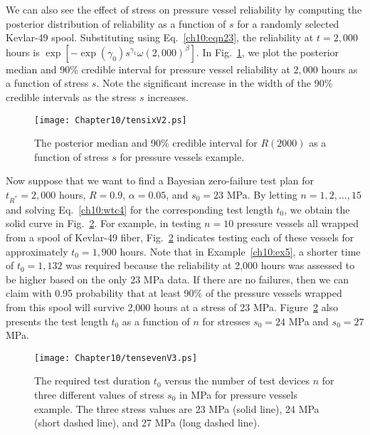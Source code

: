 \documentclass {book}
\begin{document}
We can also see the effect of stress on pressure vessel
reliability by computing the posterior distribution of reliability
as a function of $s$ for a randomly selected Kevlar-49 spool.
Substituting using Eq.~\ref{ch10:eqn23}, the reliability at $t =
2,000$ hours is $\exp[-\exp (\gamma_{0})s^{\gamma_{1}}\omega
(2,000)^{\beta}]$. In Fig.~\ref{ch10:fig6}, we plot the posterior
median and 90\% credible interval for pressure vessel reliability
at $2,000$ hours as a function of stress $s$. Note the significant
increase in the width of the 90\% credible intervals as the stress
$s$ increases.

\begin{figure}
\centerline{\texttt{[image: Chapter10/tensixV2.ps]}}
\caption{The posterior median and 90\% credible interval for $R(2000)$ as a function of stress
$s$ for pressure vessels example.}\label{ch10:fig6}
\end{figure}

Now suppose that we want to find a Bayesian zero-failure test plan
for $t_{R^*} = 2,000$ hours, $R = 0.9$, $\alpha = 0.05$, and
$s_{0} = 23$ MPa. By letting $n = 1, 2, \ldots ,15$ and solving
Eq.~\ref{ch10:wtc4} for the corresponding test length $t_{0}$, we
obtain the solid curve in Fig.~\ref{ch10:fig7}. For example, in
testing $n = 10$ pressure vessels all wrapped from a spool of
Kevlar-49 fiber, Fig.~\ref{ch10:fig7} indicates testing each of
these vessels for approximately $t_{0} = 1,900$ hours. Note that
in Example~\ref{ch10:ex5}, a shorter time of $t_{0} = 1,132$ was
required because the reliability at 2,000 hours was assessed to be
higher based on the only 23 MPa data. If there are no failures,
then we can claim with 0.95 probability that at least 90\% of the
pressure vessels wrapped from this spool will survive 2,000 hours
at a stress of 23 MPa. Figure~\ref{ch10:fig7} also presents the
test length $t_{0}$ as a function of $n$ for stresses $s_{0} = 24$
MPa and $s_{0} = 27$ MPa.

\begin{figure}
\centerline{\texttt{[image: Chapter10/tensevenV3.ps]}}
\caption{The required test duration $t_{0}$ versus the number of
test devices $n$ for three different values of stress $s_{0}$ in
MPa for pressure vessels example. The three stress values are 23
MPa (solid line), 24 MPa (short dashed line), and 27 MPa (long
dashed line).}\label{ch10:fig7}
\end{figure}
\end{document}
